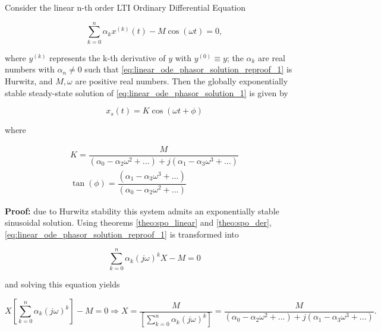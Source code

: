 \begin{theorem}\label{theo:phasors_solutions_reproof} %
Consider the linear n-th order LTI Ordinary Differential Equation

\begin{equation} \sum\limits_{k=0}^n \alpha_k x^{(k)}(t) - M\cos\left(\omega t\right) = 0,\label{eq:linear_ode_phasor_solution_reproof_1}\end{equation}

	\noindent where $y^{(k)}$ represents the k-th derivative of $y$ with $y^{(0)} \equiv y$; the $\alpha_k$ are real numbers with $\alpha_n \neq 0$ such that \eqref{eq:linear_ode_phasor_solution_reproof_1} is Hurwitz, and $M,\omega$ are positive real numbers. Then the globally exponentially stable steady-state solution of \eqref{eq:linear_ode_phasor_solution_1} is given by

\begin{equation} x_s(t) = K\cos\left(\omega t + \phi\right)\end{equation}

	\noindent where 

\begin{gather}
	K = \dfrac{M}{\left(\alpha_0 - \alpha_2\omega^2 + ...\right) + j\left(\alpha_1 - \alpha_3\omega^3 + ...\right)} \\[5mm]
	\tan\left(\phi\right) = \dfrac{\left(\alpha_1 - \alpha_3\omega^3 + ...\right)}{\left(\alpha_0 - \alpha_2\omega^2 + ...\right)}
\end{gather}

\end{theorem}
\textbf{Proof: } due to Hurwitz stability this system admits an exponentially stable sinusoidal solution. Using theorems \ref{theo:spo_linear} and \ref{theo:spo_der}, \eqref{eq:linear_ode_phasor_solution_reproof_1} is transformed into

\begin{equation} \sum\limits_{k=0}^n \alpha_k \left(j\omega\right)^k X - M = 0 \label{eq:linear_ode_phasor_solution_reproof_2} \end{equation}

	\noindent and solving this equation yields

\begin{equation} X\left[\sum\limits_{k=0}^n \alpha_k \left(j\omega\right)^k \right] - M = 0 \Rightarrow X = \dfrac{M}{\left[\sum\limits_{k=0}^n \alpha_k \left(j\omega\right)^k \right]} = \dfrac{M}{\left(\alpha_0 - \alpha_2\omega^2 + ...\right) + j\left(\alpha_1 - \alpha_3\omega^3 + ...\right)} .\end{equation}

